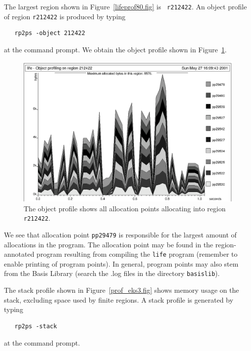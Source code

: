 \documentclass[12pt]{book}
\begin{document}
The largest region shown in Figure~\ref{lifeprof80.fig} is {\tt
  r212422}. An
%
%
object profile of region {\tt r212422} is produced by typing
\begin{verbatim}
   rp2ps -object 212422
\end{verbatim}
at the command prompt. We obtain the object profile shown in
Figure~\ref{prof_eks2.fig}.
\begin{figure}
\begin{center}
\includegraphics{prof_eks2.ps}
\end{center}
\caption{The object profile shows all allocation points allocating into region {\tt r212422}.}
\label{prof_eks2.fig}
\end{figure}

We see that allocation point \texttt{pp29479} is responsible for the
largest amount of allocations in the program. The allocation point may
be found in the region-annotated program resulting from compiling the
{\tt life} program (remember to enable printing of program points). In
general, program points may also stem from the Basis Library (search
the {.log} files in the directory {\tt basislib}).

The stack profile shown in Figure~\ref{prof_eks3.fig} shows memory
usage on the stack, excluding space used by finite regions. A 
%
%
stack profile is generated by typing
\begin{verbatim}
   rp2ps -stack
\end{verbatim}
at the command prompt.
\end{document}

